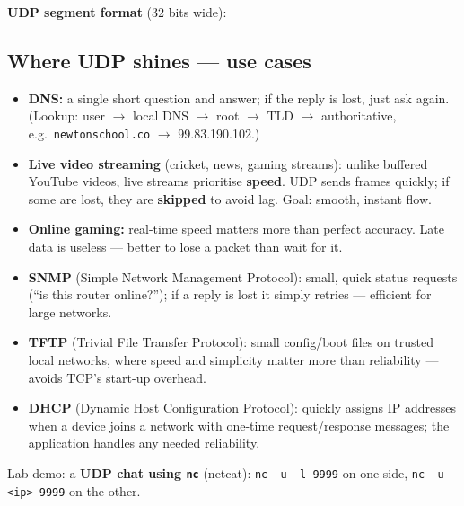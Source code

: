 \textbf{UDP segment format} (32 bits wide):
\begin{center}
\end{center}

\subsection{Where UDP shines --- use cases}
\begin{itemize}
  \item \textbf{DNS:} a single short question and answer; if the reply is lost, just ask again. (Lookup: user $\to$ local DNS $\to$ root $\to$ TLD $\to$ authoritative, e.g.\ \texttt{newtonschool.co} $\to$ 99.83.190.102.)
  \item \textbf{Live video streaming} (cricket, news, gaming streams): unlike buffered YouTube videos, live streams prioritise \textbf{speed}. UDP sends frames quickly; if some are lost, they are \textbf{skipped} to avoid lag. Goal: smooth, instant flow.
  \item \textbf{Online gaming:} real-time speed matters more than perfect accuracy. Late data is useless --- better to lose a packet than wait for it.
  \item \textbf{SNMP} (Simple Network Management Protocol): small, quick status requests (``is this router online?''); if a reply is lost it simply retries --- efficient for large networks.
  \item \textbf{TFTP} (Trivial File Transfer Protocol): small config/boot files on trusted local networks, where speed and simplicity matter more than reliability --- avoids TCP's start-up overhead.
  \item \textbf{DHCP} (Dynamic Host Configuration Protocol): quickly assigns IP addresses when a device joins a network with one-time request/response messages; the application handles any needed reliability.
\end{itemize}
Lab demo: a \textbf{UDP chat using \texttt{nc}} (netcat): \texttt{nc -u -l 9999} on one side, \texttt{nc -u <ip> 9999} on the other.

